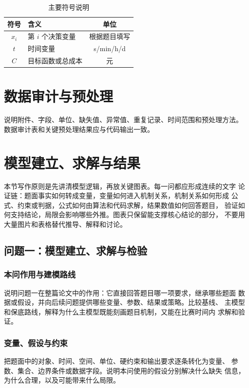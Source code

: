 \documentclass[12pt,a4paper]{ctexart}
\begin{document}
\begin{table}[H]
\centering
\caption{主要符号说明}
\begin{tabularx}{\textwidth}{CLC}
\toprule
符号 & 含义 & 单位 \\
\midrule
$x_i$ & 第 $i$ 个决策变量 & 根据题目填写 \\
$t$ & 时间变量 & s/min/h/d \\
$C$ & 目标函数或总成本 & 元 \\
\bottomrule
\end{tabularx}
\end{table}

\section{数据审计与预处理}

说明附件、字段、单位、缺失值、异常值、重复记录、时间范围和预处理方法。
数据审计表和关键预处理结果应与代码输出一致。

\section{模型建立、求解与结果}

本节写作原则是先讲清模型逻辑，再放关键图表。每一问都应形成连续的文字
论证链：题面事实如何转成变量，变量如何进入机制关系，机制关系如何形成
公式、约束或判据，公式如何由算法和代码求解，结果数值如何回答题目，
验证如何支持结论，局限会影响哪些外推。图表只保留能支撑核心结论的部分，
不要用大量图片和表格替代推导、解释和讨论。

\subsection{问题一：模型建立、求解与检验}

\subsubsection{本问作用与建模路线}

说明问题一在整篇论文中的作用：它直接回答题目哪一项要求，继承哪些题面
数据或假设，并向后续问题提供哪些变量、参数、结果或策略。比较基线、
主模型和保底路线，解释为什么主模型既能刻画题目机制，又能在比赛时间内
求解和验证。

\subsubsection{变量、假设与约束}

把题面中的对象、时间、空间、单位、硬约束和输出要求逐条转化为变量、
参数、集合、边界条件或数据字段。说明本问使用的假设分别解决什么缺失
信息，为什么合理，以及可能带来什么局限。
\end{document}
